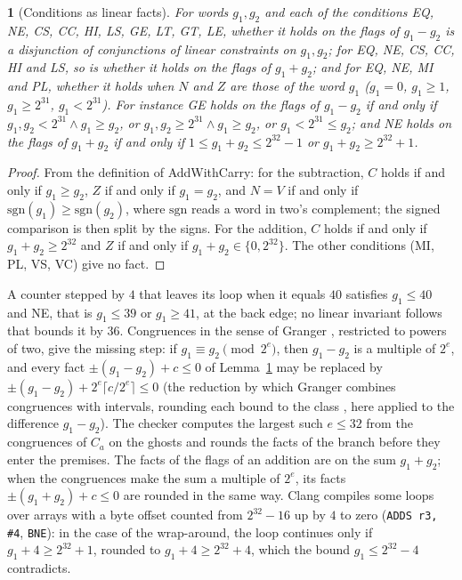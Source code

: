 \documentclass[oneside,english]{amsart}
\numberwithin{equation}{section}
\theoremstyle{plain}
\theoremstyle{definition}
\theoremstyle{plain}
\theoremstyle{plain}
\newtheorem{lem}[thm]{\protect\lemmaname}
\theoremstyle{remark}
\providecommand{\lemmaname}{Lemma}
\begin{document}
\begin{lem}[Conditions as linear facts]
\label{lem:cond-facts}
For words $g_1, g_2$ and each of the conditions EQ, NE, CS, CC, HI, LS, GE, LT, GT, LE, whether it holds on the flags of $g_1 - g_2$ is a disjunction of conjunctions of linear constraints on $g_1, g_2$; for EQ, NE, CS, CC, HI and LS, so is whether it holds on the flags of $g_1 + g_2$; and for EQ, NE, MI and PL, whether it holds when $N$ and $Z$ are those of the word $g_1$ ($g_1 = 0$, $g_1 \ge 1$, $g_1 \ge 2^{31}$, $g_1 < 2^{31}$). For instance GE holds on the flags of $g_1 - g_2$ if and only if $g_1, g_2 < 2^{31} \wedge g_1 \ge g_2$, or $g_1, g_2 \ge 2^{31} \wedge g_1 \ge g_2$, or $g_1 < 2^{31} \le g_2$; and NE holds on the flags of $g_1 + g_2$ if and only if $1 \le g_1 + g_2 \le 2^{32} - 1$ or $g_1 + g_2 \ge 2^{32} + 1$.
\end{lem}

\begin{proof}
From the definition of AddWithCarry: for the subtraction, $C$ holds if and only if $g_1 \ge g_2$, $Z$ if and only if $g_1 = g_2$, and $N = V$ if and only if $\mathrm{sgn}(g_1) \ge \mathrm{sgn}(g_2)$, where $\mathrm{sgn}$ reads a word in two's complement; the signed comparison is then split by the signs. For the addition, $C$ holds if and only if $g_1 + g_2 \ge 2^{32}$ and $Z$ if and only if $g_1 + g_2 \in \{0, 2^{32}\}$. The other conditions (MI, PL, VS, VC) give no fact.
\end{proof}

A counter stepped by $4$ that leaves its loop when it equals $40$ satisfies $g_1 \le 40$ and NE, that is $g_1 \le 39$ or $g_1 \ge 41$, at the back edge; no linear invariant follows that bounds it by $36$. Congruences in the sense of Granger \cite{granger1989static}, restricted to powers of two, give the missing step: if $g_1 \equiv g_2 \pmod{2^e}$, then $g_1 - g_2$ is a multiple of $2^e$, and every fact $\pm(g_1 - g_2) + c \le 0$ of Lemma~\ref{lem:cond-facts} may be replaced by $\pm(g_1 - g_2) + 2^e \lceil c / 2^e \rceil \le 0$ (the reduction by which Granger combines congruences with intervals, rounding each bound to the class \cite[Proposition~6.1]{granger1989static}, here applied to the difference $g_1 - g_2$). The checker computes the largest such $e \le 32$ from the congruences of $C_a$ on the ghosts and rounds the facts of the branch before they enter the premises. The facts of the flags of an addition are on the sum $g_1 + g_2$; when the congruences make the sum a multiple of $2^e$, its facts $\pm(g_1 + g_2) + c \le 0$ are rounded in the same way. Clang compiles some loops over arrays with a byte offset counted from $2^{32} - 16$ up by $4$ to zero (\texttt{ADDS r3, \#4}, \texttt{BNE}): in the case of the wrap-around, the loop continues only if $g_1 + 4 \ge 2^{32} + 1$, rounded to $g_1 + 4 \ge 2^{32} + 4$, which the bound $g_1 \le 2^{32} - 4$ contradicts.
\end{document}
